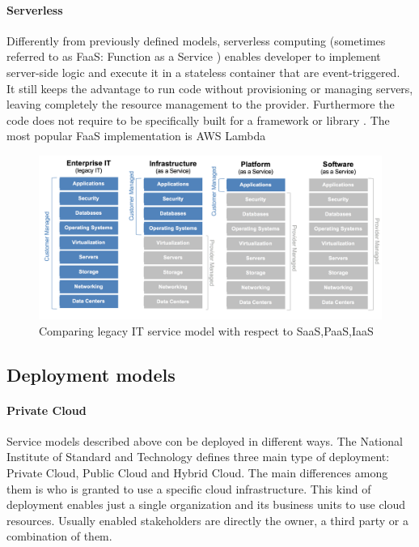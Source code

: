\paragraph{Serverless}
\label{paragraph:Serverless}
Differently from previously defined models, serverless computing (sometimes referred to as FaaS: Function as a Service \cite{sls_wikipedia}) enables developer to implement server-side logic and execute it in a stateless container that are event-triggered.\\
It still keeps the advantage to run code without provisioning or managing servers, leaving completely the resource management to the provider.
Furthermore the code does not require to be specifically built for a framework or library \cite{martin_serverless}.
The most popular FaaS implementation is AWS Lambda

\begin{figure}[h]
    \centering
    \includegraphics[width=\textwidth,keepaspectratio]{img/saas_paas_iaas}
    \caption{Comparing legacy IT service model with respect to SaaS,PaaS,IaaS}
    \label{fig:saas_paas_iaas}
\end{figure}

\subsection{Deployment models}

\paragraph{Private Cloud}
Service models described above con be deployed in different ways. The National Institute of Standard and Technology defines three main type of deployment: Private Cloud, Public Cloud and Hybrid Cloud. \cite{nist}
The main differences among them is who is granted to use a specific cloud infrastructure.
\label{paragraph:Private Cloud}
This kind of deployment enables just a single organization and its business units to use cloud resources.
Usually enabled stakeholders are directly the owner, a third party or a combination of them.

